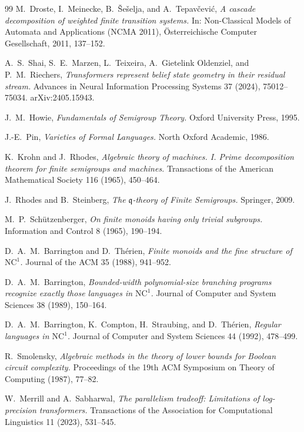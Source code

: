 \documentclass[10pt]{article}
\theoremstyle{definition}
\theoremstyle{remark}
\begin{document}
\begin{thebibliography}{99}
M.~Droste, I.~Meinecke, B.~\v{S}e\v{s}elja, and A.~Tepav\v{c}evi\'c,
\emph{A cascade decomposition of weighted finite transition systems.}
In: Non-Classical Models of Automata and Applications (NCMA 2011),
\"Osterreichische Computer Gesellschaft, 2011, 137--152.

A.~S.~Shai, S.~E.~Marzen, L.~Teixeira, A.~Gietelink Oldenziel, and
P.~M.~Riechers,
\emph{Transformers represent belief state geometry in their residual
stream.}
Advances in Neural Information Processing Systems 37 (2024),
75012--75034.  arXiv:2405.15943.

J.~M.~Howie,
\emph{Fundamentals of Semigroup Theory.}
Oxford University Press, 1995.

J.-E.~Pin,
\emph{Varieties of Formal Languages.}
North Oxford Academic, 1986.

K.~Krohn and J.~Rhodes,
\emph{Algebraic theory of machines. I. Prime decomposition theorem
for finite semigroups and machines.}
Transactions of the American Mathematical Society 116 (1965),
450--464.

J.~Rhodes and B.~Steinberg,
\emph{The $\mathfrak q$-theory of Finite Semigroups.}
Springer, 2009.

M.~P.~Sch\"utzenberger,
\emph{On finite monoids having only trivial subgroups.}
Information and Control 8 (1965), 190--194.

D.~A.~M.~Barrington and D.~Th\'erien,
\emph{Finite monoids and the fine structure of $\mathrm{NC}^1$.}
Journal of the ACM 35 (1988), 941--952.

D.~A.~M.~Barrington,
\emph{Bounded-width polynomial-size branching programs recognize
exactly those languages in $\mathrm{NC}^1$.}
Journal of Computer and System Sciences 38 (1989), 150--164.

D.~A.~M.~Barrington, K.~Compton, H.~Straubing, and D.~Th\'erien,
\emph{Regular languages in $\mathrm{NC}^1$.}
Journal of Computer and System Sciences 44 (1992), 478--499.

R.~Smolensky,
\emph{Algebraic methods in the theory of lower bounds for Boolean
circuit complexity.}
Proceedings of the 19th ACM Symposium on Theory of Computing (1987),
77--82.

W.~Merrill and A.~Sabharwal,
\emph{The parallelism tradeoff: Limitations of log-precision
transformers.}
Transactions of the Association for Computational Linguistics 11
(2023), 531--545.


\end{thebibliography}
\end{document}
